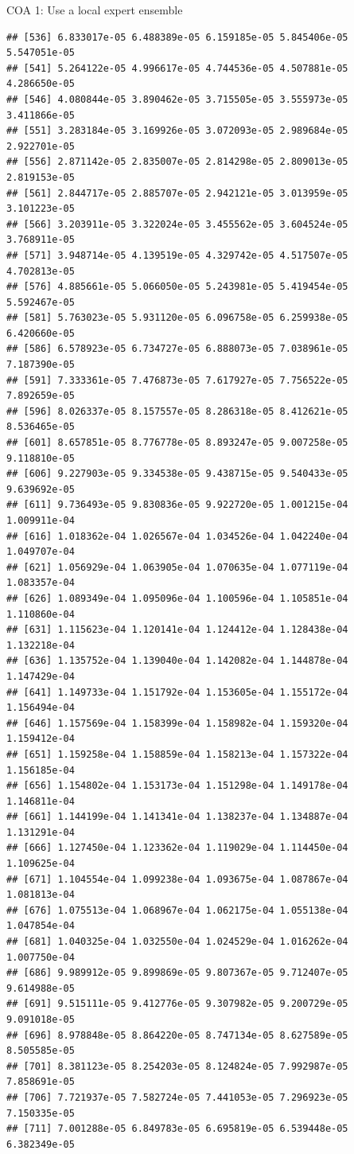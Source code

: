 \documentclass[ignorenonframetext,]{beamer}
\begin{document}
\begin{frame}[fragile]{COA 1: Use a local expert ensemble}
\begin{verbatim}
## [536] 6.833017e-05 6.488389e-05 6.159185e-05 5.845406e-05 5.547051e-05
## [541] 5.264122e-05 4.996617e-05 4.744536e-05 4.507881e-05 4.286650e-05
## [546] 4.080844e-05 3.890462e-05 3.715505e-05 3.555973e-05 3.411866e-05
## [551] 3.283184e-05 3.169926e-05 3.072093e-05 2.989684e-05 2.922701e-05
## [556] 2.871142e-05 2.835007e-05 2.814298e-05 2.809013e-05 2.819153e-05
## [561] 2.844717e-05 2.885707e-05 2.942121e-05 3.013959e-05 3.101223e-05
## [566] 3.203911e-05 3.322024e-05 3.455562e-05 3.604524e-05 3.768911e-05
## [571] 3.948714e-05 4.139519e-05 4.329742e-05 4.517507e-05 4.702813e-05
## [576] 4.885661e-05 5.066050e-05 5.243981e-05 5.419454e-05 5.592467e-05
## [581] 5.763023e-05 5.931120e-05 6.096758e-05 6.259938e-05 6.420660e-05
## [586] 6.578923e-05 6.734727e-05 6.888073e-05 7.038961e-05 7.187390e-05
## [591] 7.333361e-05 7.476873e-05 7.617927e-05 7.756522e-05 7.892659e-05
## [596] 8.026337e-05 8.157557e-05 8.286318e-05 8.412621e-05 8.536465e-05
## [601] 8.657851e-05 8.776778e-05 8.893247e-05 9.007258e-05 9.118810e-05
## [606] 9.227903e-05 9.334538e-05 9.438715e-05 9.540433e-05 9.639692e-05
## [611] 9.736493e-05 9.830836e-05 9.922720e-05 1.001215e-04 1.009911e-04
## [616] 1.018362e-04 1.026567e-04 1.034526e-04 1.042240e-04 1.049707e-04
## [621] 1.056929e-04 1.063905e-04 1.070635e-04 1.077119e-04 1.083357e-04
## [626] 1.089349e-04 1.095096e-04 1.100596e-04 1.105851e-04 1.110860e-04
## [631] 1.115623e-04 1.120141e-04 1.124412e-04 1.128438e-04 1.132218e-04
## [636] 1.135752e-04 1.139040e-04 1.142082e-04 1.144878e-04 1.147429e-04
## [641] 1.149733e-04 1.151792e-04 1.153605e-04 1.155172e-04 1.156494e-04
## [646] 1.157569e-04 1.158399e-04 1.158982e-04 1.159320e-04 1.159412e-04
## [651] 1.159258e-04 1.158859e-04 1.158213e-04 1.157322e-04 1.156185e-04
## [656] 1.154802e-04 1.153173e-04 1.151298e-04 1.149178e-04 1.146811e-04
## [661] 1.144199e-04 1.141341e-04 1.138237e-04 1.134887e-04 1.131291e-04
## [666] 1.127450e-04 1.123362e-04 1.119029e-04 1.114450e-04 1.109625e-04
## [671] 1.104554e-04 1.099238e-04 1.093675e-04 1.087867e-04 1.081813e-04
## [676] 1.075513e-04 1.068967e-04 1.062175e-04 1.055138e-04 1.047854e-04
## [681] 1.040325e-04 1.032550e-04 1.024529e-04 1.016262e-04 1.007750e-04
## [686] 9.989912e-05 9.899869e-05 9.807367e-05 9.712407e-05 9.614988e-05
## [691] 9.515111e-05 9.412776e-05 9.307982e-05 9.200729e-05 9.091018e-05
## [696] 8.978848e-05 8.864220e-05 8.747134e-05 8.627589e-05 8.505585e-05
## [701] 8.381123e-05 8.254203e-05 8.124824e-05 7.992987e-05 7.858691e-05
## [706] 7.721937e-05 7.582724e-05 7.441053e-05 7.296923e-05 7.150335e-05
## [711] 7.001288e-05 6.849783e-05 6.695819e-05 6.539448e-05 6.382349e-05

\end{verbatim}
\end{frame}
\end{document}
